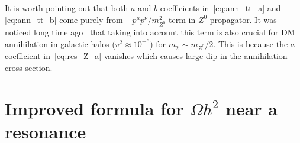 \documentclass[12pt,twoside]{article}
\begin{document}
It is worth pointing out that both $a$ and $b$ coefficients in~\eqref{eq:ann_tt_a} and \eqref{eq:ann_tt_b} come purely from $-p^\mu p^\nu/m_{Z^0}^2$ term in $Z^0$ propagator. It was noticed long time ago~\cite{ann_tt_1,ann_tt_2} that taking into account this term is also crucial for DM annihilation in galactic halos ($v^2\approx 10^{-6}$) for $m_\chi\sim m_{Z^0}/2$. This is because the $a$ coefficient in~\eqref{eq:res_Z_a} vanishes which causes large dip in the annihilation cross section.


\section{Improved formula for $\Omega h^2$ near a resonance}
\label{App:relic_density}
\end{document}
